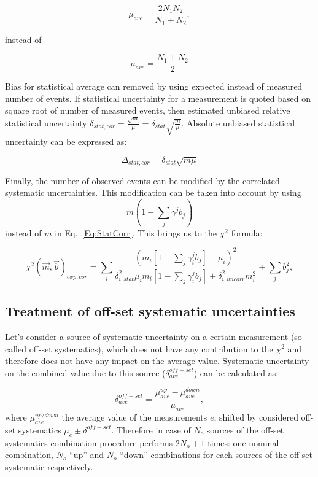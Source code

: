 \begin{equation}
  \mu_{ave} = \frac{2N_1N_2}{N_1+N_2},
\end{equation}

instead of 

\begin{equation}
  \mu_{ave} = \frac{N_1 + N_2}{2}
\end{equation}

Bias for statistical average can removed by using expected instead of measured number of events. If statistical uncertainty for a measurement is quoted based on square root of number of measured events, then estimated unbiased relative statistical uncertainty $\delta_{stat,cor} = \frac{\sqrt{m}}{\mu} = \delta_{stat} \sqrt{\frac{m}{\mu}} $. Absolute unbiased statistical uncertainty can be expressed as:

\begin{equation}
 \Delta_{stat,cor} = \delta_{stat} \sqrt{m\mu}
  \label{Eq:StatCorr}
\end{equation}

Finally, the number of observed events can be modified by the correlated systematic uncertainties. This modification can be taken into account by using 
\begin{equation}
  m(1-\sum_j \gamma^jb_j)
  \label{Eq:StatCorr2}
\end{equation}
instead of $m$ in Eq.~\ref{Eq:StatCorr}. This brings us to the $\chi^2$  formula:

\begin{equation}
  \chi^2(\vec{m},\vec{b})_{exp,cor} = \sum_{i} \frac{(m_i[1-\sum_j \gamma_i^jb_j]  - \mu_i)^2}{\delta_{i, stat}^2\mu_im_i[1-\sum_j \gamma_i^jb_j] + \delta_{i, uncorr}^2m_i^2} + \sum_{j}
  b_j^2,
  \label{Eq:StatCorrChiSq2b}
\end{equation}


\subsection{Treatment of off-set systematic uncertainties}
\label{Sec:offset}

Let's consider a source of systematic uncertainty on a certain measurement (so called off-set systematics), which does not have any contribution to the $\chi^2$ and therefore does not have any impact on the average value. Systematic uncertainty on the combined value due to this source ($\delta^{off-set}_{ave}$) can be calculated as: 

 \begin{equation}
  \delta^{off-set}_{ave} = \frac{\mu_{ave}^{up} - \mu_{ave}^{down}}{\mu_{ave}},
\end{equation}
where $\mu_{ave}^{up/down}$ the average value of the measurements $e$, shifted by considered off-set systematics $\mu_e \pm \delta^{off-set}$. Therefore in case of $N_o$ sources of the off-set systematics combination procedure performs $2N_o+1$ times: one nominal combination, $N_o$ ``up'' and $N_o$ ``down'' combinations for each sources of the off-set systematic respectively.



